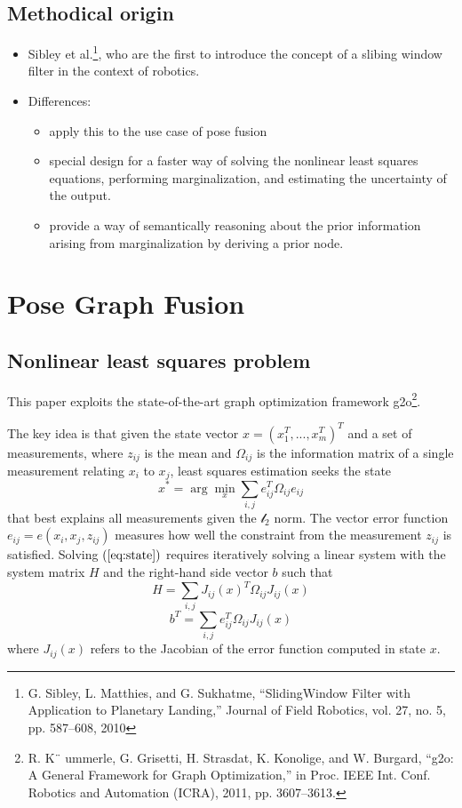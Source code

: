 \documentclass[letterpaper,11pt]{article}
\begin{document}
\subsection{Methodical origin}

\begin{itemize}
	\item Sibley et al.\footnote{G. Sibley, L. Matthies, and G. Sukhatme, “SlidingWindow Filter with Application to Planetary Landing,” Journal of Field Robotics, vol. 27, no. 5, pp. 587–608, 2010}, who are the first to introduce the concept of a slibing window filter in the context of robotics.
	\item Differences:
	\begin{itemize}
		\item apply this to the use case of pose fusion
		\item special design for a faster way of solving the nonlinear least squares equations, performing marginalization, and estimating the uncertainty of the output.
		\item provide a way of semantically reasoning about the prior information arising from marginalization by deriving a prior node.
	\end{itemize}
\end{itemize}

\section{Pose Graph Fusion}

\subsection{Nonlinear least squares problem}

This paper exploits the state-of-the-art graph optimization framework g2o\footnote{R. K¨ ummerle, G. Grisetti, H. Strasdat, K. Konolige, and W. Burgard, “g2o: A General Framework for Graph Optimization,” in Proc. IEEE Int. Conf. Robotics and Automation (ICRA), 2011, pp. 3607–3613.}.

The key idea is that given the state vector $x=(x_1^T, ..., x_m^T)^T$ and a set of measurements, where $z_{ij}$ is the mean and $\Omega_{ij}$ is the information matrix of a single measurement relating $x_i$ to $x_j$, least squares estimation seeks the state
\begin{equation}
x^*=\arg\min_x{\sum_{i,j}e_{ij}^T\Omega_{ij}e_{ij}}
\label{eq:state}
\end{equation}
that best explains all measurements given the $\mathcal{l}_2$ norm. The vector error function $e_{ij}=e(x_i,x_j,z_{ij})$ measures how well the constraint from the measurement $z_{ij}$ is satisfied. Solving $(\ref{eq:state})$ requires iteratively solving a linear system with the system matrix $H$ and the right-hand side vector $b$ such that
$$H=\sum_{i,j}{J_{ij}(x)^T\Omega_{ij}J_{ij}(x)}$$
$$b^T=\sum_{i,j}e_{ij}^T\Omega_{ij}J_{ij}(x)$$
where $J_{ij}(x)$ refers to the Jacobian of the error function computed in state $x$.
\end{document}
